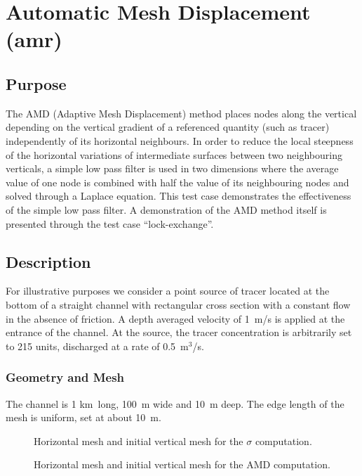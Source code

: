 \chapter{Automatic Mesh Displacement (amr)}

\section{Purpose}
The AMD (Adaptive Mesh Displacement) method places nodes along the vertical
depending on the vertical gradient of a referenced quantity (such as tracer)
independently of its horizontal neighbours. In order to reduce the local
steepness of the horizontal variations of intermediate surfaces between two
neighbouring verticals, a simple low pass filter is used in two dimensions where
the average value of one node is combined with half the value of its neighbouring
nodes and solved through a Laplace equation.
This test case demonstrates the effectiveness of the simple low pass filter.
A demonstration of the AMD method itself is presented through the test case “lock-exchange”.

\section{Description}
For illustrative purposes we consider a point source of tracer located at the
bottom of a straight channel with rectangular cross section with a constant flow
in the absence of friction.
A depth averaged velocity of 1~m/s is applied at the entrance of the channel.
At the source, the tracer concentration is arbitrarily set to 215 units,
discharged at a rate of 0.5~m$^3$/s.

\subsection{Geometry and Mesh}
The channel is 1 km~long, 100~m wide and 10~m deep.
The edge length of the mesh is uniform, set at about 10~m.
\begin{figure}
 \centering
{}
\caption{Horizontal mesh and initial vertical mesh for the $\sigma$ computation.}
\label{fig:amrsigma:mesh}
\end{figure}

\begin{figure}
 \centering
{}
\caption{Horizontal mesh and initial vertical mesh for the AMD computation.}
\label{fig:amr:mesh}
\end{figure}

